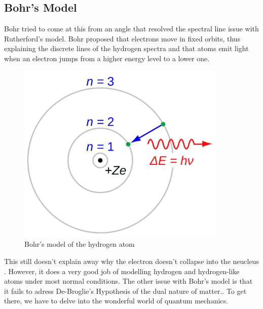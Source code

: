 \subsection{Bohr's Model}

Bohr tried to come at this from an angle that resolved the spectral line issue with Rutherford's model.
Bohr proposed that electrons move in fixed orbits, thus explaining the discrete lines of the hydrogen spectra and that atoms emit light when an electron jumps from a higher energy level to a lower one.

\begin{figure}[H]
  \centering
  \includegraphics[width=100mm]{figures/bohr.png}
  \caption{Bohr's model of the hydrogen atom}
  \label{bohr}
\end{figure}

This still doesn't explain away why the electron doesn't collapse into the neucleus .
However, it does a very good job of modelling hydrogen and hydrogen-like atoms under most normal conditions.
The other issue with Bohr's model is that it fails to adress De-Broglie’s Hypothesis of the dual nature of matter..
To get there, we have to delve into the wonderful world of quantum mechanics.
